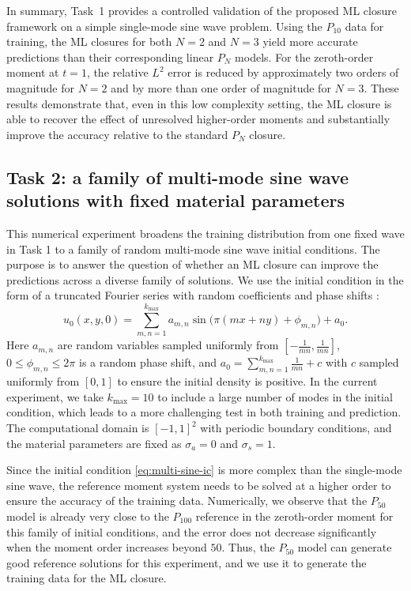 \documentclass[11pt]{article}
\numberwithin{equation}{section}
\begin{document}
In summary, Task~1 provides a controlled validation of the proposed ML closure framework on a simple single-mode sine wave problem. Using the $P_{10}$ data for training, the ML closures for both $N=2$ and $N=3$ yield more accurate predictions than their corresponding linear $P_N$ models. For the zeroth-order moment at $t=1$, the relative $L^2$ error is reduced by approximately two orders of magnitude for $N=2$ and by more than one order of magnitude for $N=3$. These results demonstrate that, even in this low complexity setting, the ML closure is able to recover the effect of unresolved higher-order moments and substantially improve the accuracy relative to the standard $P_N$ closure.






\subsection{Task 2: a family of multi-mode sine wave solutions with fixed material parameters}

This numerical experiment broadens the training distribution from one fixed wave in Task 1 to a family of random multi-mode sine wave initial conditions. The purpose is to answer the question of whether an ML closure can improve the predictions across a diverse family of solutions. We use the initial condition in the form of a truncated Fourier series with random coefficients and phase shifts \cite{han2019uniformly}:
\begin{equation}\label{eq:multi-sine-ic}
    u_0(x,y,0) = \sum_{m, n=1}^{k_{\max}} a_{m, n} \sin\bigl(\pi(m x + n y) + \phi_{m, n}\bigr) + a_0.
\end{equation}
Here $a_{m,n}$ are random variables sampled uniformly from $[-\frac{1}{mn}, \frac{1}{mn}]$, $0\le \phi_{m,n}\le 2\pi$ is a random phase shift, and $a_0 = \sum_{m, n=1}^{k_{\max}} \frac{1}{mn} + c$ with $c$ sampled uniformly from $[0,1]$ to ensure the initial density is positive. In the current experiment, we take $k_{\max}=10$ to include a large number of modes in the initial condition, which leads to a more challenging test in both training and prediction. The computational domain is $[-1, 1]^2$ with periodic boundary conditions, and the material parameters are fixed as $\sigma_a=0$ and $\sigma_{s}=1$.

Since the initial condition \eqref{eq:multi-sine-ic} is more complex than the single-mode sine wave, the reference moment system needs to be solved at a higher order to ensure the accuracy of the training data. Numerically, we observe that the $P_{50}$ model is already very close to the $P_{100}$ reference in the zeroth-order moment for this family of initial conditions, and the error does not decrease significantly when the moment order increases beyond $50$. Thus, the $P_{50}$ model can generate good reference solutions for this experiment, and we use it to generate the training data for the ML closure.
\end{document}

